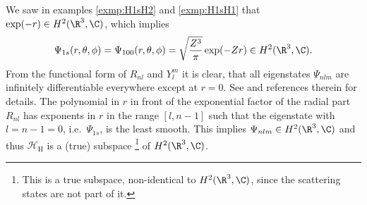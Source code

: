 We saw in examples \vref{exmp:H1sH2} and \vref{exmp:H1sH1}
that $\exp(-r) \in H^2(\R^3, \C)$,
which implies
\begin{equation}
	\Psi_{1s}(r, \theta, \phi) = \Psi_{100}(r, \theta, \phi)
	= \sqrt{\frac{Z^3}{\pi}} \exp(-Z r) \in H^2(\R^3, \C).
	\label{eqn:FunctionGShydrogen}
\end{equation}
From the functional form of $R_{nl}$ and $Y_l^m$ it is clear,
that all eigenstates $\Psi_{nlm}$ are infinitely differentiable everywhere
except at $r = 0$.
See \cite{Kato1957} and references therein for details.
The polynomial in $r$ in front of the exponential factor of the radial part $R_{nl}$
has exponents in $r$ in the range $[l, n-1]$
such that the eigenstate with $l = n-1 = 0$, i.e.~$\Psi_{1s}$, is the least smooth.
This implies $\Psi_{nlm} \in H^2(\R^3, \C)$ and thus
$\mathcal{H}_\text{H}$ is a (true) subspace%
\footnote{
	This is a true subspace, \ie non-identical to $H^2(\R^3, \C)$,
	since the scattering states are not part of it.
}
of $H^2(\R^3, \C)$.
